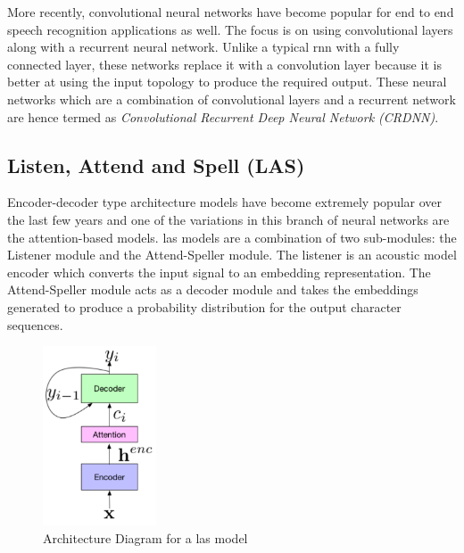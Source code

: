 More recently, convolutional neural networks have become popular for end to end speech recognition applications as well. \cite{Zhang2017VeryRecognition} The focus is on using convolutional layers along with a recurrent neural network. Unlike a typical \acrshort{rnn} with a fully connected layer, these networks replace it with a convolution layer because it is better at using the input topology to produce the required output. These neural networks which are a combination of convolutional layers and a recurrent network are hence termed as \emph{Convolutional Recurrent Deep Neural Network (CRDNN)}. 

\subsection {Listen, Attend and Spell (LAS)}
Encoder-decoder type architecture models have become extremely popular over the last few years and one of the variations in this branch of neural networks are the attention-based models. \cite{Vaswani2017AttentionNeed,  Prabhavalkar2017ARecognition} \acrfull{las} models are a combination of two sub-modules: the Listener module and the Attend-Speller module. The listener is an acoustic model encoder which converts the input signal to an embedding representation. The Attend-Speller module acts as a decoder module and takes the embeddings generated to produce a probability distribution for the output character sequences. \cite{Zhang2017VeryRecognition, Chan2016ListenRecognition}

\begin{figure}[ht]
  \begin{center}
    \includegraphics[width=0.3\textwidth]{images/las.png} 
    \caption{Architecture Diagram for a \acrshort{las} model  \cite{Chiu2017State-of-the-artModels}}
    \label{fig:las}
  \end{center}
\end{figure}


